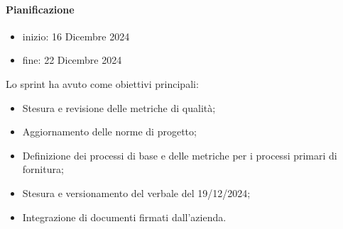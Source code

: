 \documentclass{article}
\begin{document}
                \paragraph{Pianificazione}
                \begin{itemize}
                    \item inizio: 16 Dicembre 2024
                    \item fine: 22 Dicembre 2024
                \end{itemize}
                Lo sprint ha avuto come obiettivi principali:
                \begin{itemize}
                    \item Stesura e revisione delle metriche di qualità;
                    \item Aggiornamento delle norme di progetto;
                    \item Definizione dei processi di base e delle metriche per i processi primari di fornitura;
                    \item Stesura e versionamento del verbale del 19/12/2024;
                    \item Integrazione di documenti firmati dall'azienda.
                \end{itemize}

\end{document}
